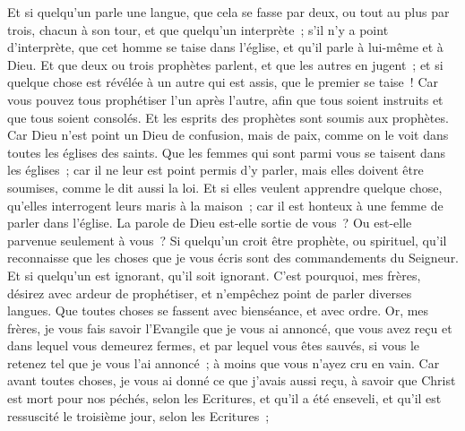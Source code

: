 \begin{multicols}{2}
Et si quelqu'un parle une langue, que cela se fasse par deux, ou tout au plus par trois, chacun à son tour, et que quelqu'un interprète~;
s'il n'y a point d'interprète, que cet homme se taise dans l'église, et qu'il parle à lui-même et à Dieu.
Et que deux ou trois prophètes parlent, et que les autres en jugent~;
et si quelque chose est révélée à un autre qui est assis, que le premier se taise~!
Car vous pouvez tous prophétiser l'un après l'autre, afin que tous soient instruits et que tous soient consolés.
Et les esprits des prophètes sont soumis aux prophètes.
Car Dieu n'est point un Dieu de confusion, mais de paix, comme on le voit dans toutes les églises des saints.
Que les femmes qui sont parmi vous se taisent dans les églises~; car il ne leur est point permis d'y parler, mais elles doivent être soumises, comme le dit aussi la loi.
Et si elles veulent apprendre quelque chose, qu'elles interrogent leurs maris à la maison~; car il est honteux à une femme de parler dans l'église.
 La parole de Dieu est-elle sortie de vous~? Ou est-elle parvenue seulement à vous~?
Si quelqu'un croit être prophète, ou spirituel, qu'il reconnaisse que les choses que je vous écris sont des commandements du Seigneur.
Et si quelqu'un est ignorant, qu'il soit ignorant.
C'est pourquoi, mes frères, désirez avec ardeur de prophétiser, et n'empêchez point de parler diverses langues.
Que toutes choses se fassent avec bienséance, et avec ordre.
\VerseOne{}Or, mes frères, je vous fais savoir l'Evangile que je vous ai annoncé, que vous avez reçu et dans lequel vous demeurez fermes,
et par lequel vous êtes sauvés, si vous le retenez tel que je vous l'ai annoncé~; à moins que vous n'ayez cru en vain. 
Car avant toutes choses, je vous ai donné ce que j'avais aussi reçu, à savoir que Christ est mort pour nos péchés, selon les Ecritures,
et qu'il a été enseveli, et qu'il est ressuscité le troisième jour, selon les Ecritures~;

\end{multicols}
